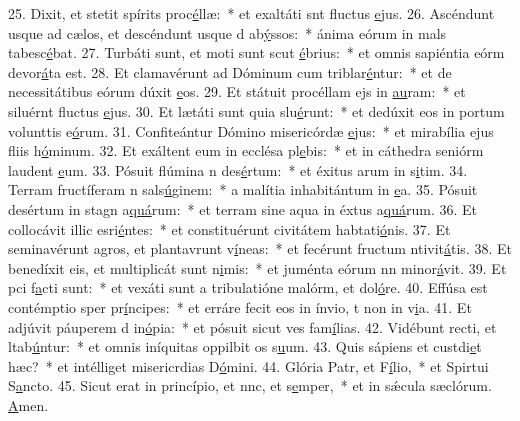 25. Dixit, et stetit spírits proc\uline{é}llæ:~* et exaltáti snt fluctus \uline{e}jus.
26. Ascéndunt usque ad cælos, et descéndunt usque d ab\uline{ý}ssos:~* ánima eórum in mals tabesc\uline{é}bat.
27. Turbáti sunt, et moti sunt scut \uline{é}brius:~* et omnis sapiéntia eórm devor\uline{á}ta est.
28. Et clamavérunt ad Dóminum cum triblar\uline{é}ntur:~* et de necessitátibus eórum dúxit \uline{e}os.
29. Et státuit procéllam ejs in \uline{au}ram:~* et siluérnt fluctus \uline{e}jus.
30. Et lætáti sunt quia slu\uline{é}runt:~* et dedúxit eos in portum volunttis e\uline{ó}rum.
31. Confiteántur Dómino misericórdæ \uline{e}jus:~* et mirabília ejus fliis h\uline{ó}minum.
32. Et exáltent eum in ecclésa pl\uline{e}bis:~* et in cáthedra seniórm laudent \uline{e}um.
33. Pósuit flúmina n des\uline{é}rtum:~* et éxitus arum in s\uline{i}tim.
34. Terram fructíferam n sals\uline{ú}ginem:~* a malítia inhabitántum in \uline{e}a.
35. Pósuit desértum in stagn a\uline{quá}rum:~* et terram sine aqua in éxtus a\uline{quá}rum.
36. Et collocávit illic esri\uline{é}ntes:~* et constituérunt civitátem habtati\uline{ó}nis.
37. Et seminavérunt agros, et plantavrunt v\uline{í}neas:~* et fecérunt fructum ntivit\uline{á}tis.
38. Et benedíxit eis, et multiplicát sunt n\uline{i}mis:~* et juménta eórum nn minor\uline{á}vit.
39. Et pci f\uline{a}cti sunt:~* et vexáti sunt a tribulatióne malórm, et dol\uline{ó}re.
40. Effúsa est contémptio sper pr\uline{í}ncipes:~* et erráre fecit eos in ínvio, t non in v\uline{i}a.
41. Et adjúvit páuperem d in\uline{ó}pia:~* et pósuit sicut ves fam\uline{í}lias.
42. Vidébunt recti, et ltab\uline{ú}ntur:~* et omnis iníquitas oppilbit os s\uline{u}um.
43. Quis sápiens et custdi\uline{e}t hæc?~* et intélliget misericrdias D\uline{ó}mini.
44. Glória Patr, et F\uline{í}lio,~* et Spirtui S\uline{a}ncto.
45. Sicut erat in princípio, et nnc, et s\uline{e}mper,~* et in sǽcula sæclórum. \uline{A}men.
